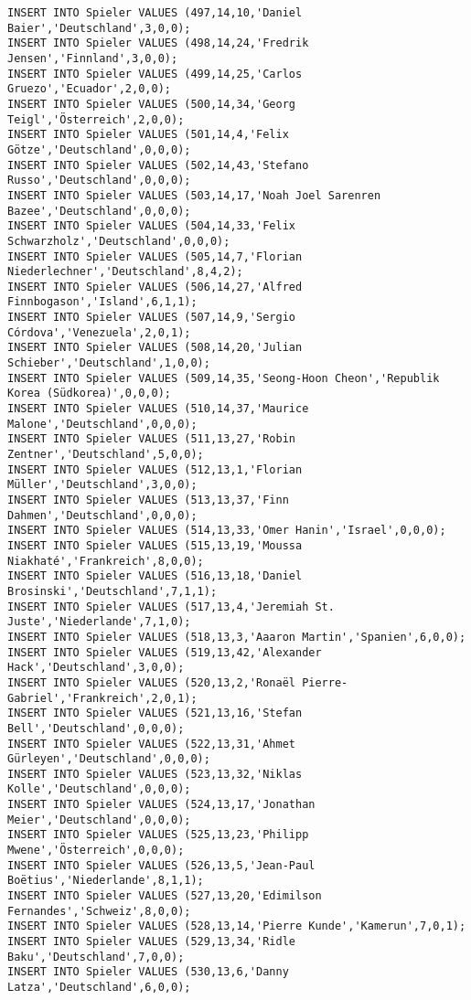 \documentclass{bschlangaul-aufgabe}
\begin{document}
\begin{verbatim}
INSERT INTO Spieler VALUES (497,14,10,'Daniel Baier','Deutschland',3,0,0);
INSERT INTO Spieler VALUES (498,14,24,'Fredrik Jensen','Finnland',3,0,0);
INSERT INTO Spieler VALUES (499,14,25,'Carlos Gruezo','Ecuador',2,0,0);
INSERT INTO Spieler VALUES (500,14,34,'Georg Teigl','Österreich',2,0,0);
INSERT INTO Spieler VALUES (501,14,4,'Felix Götze','Deutschland',0,0,0);
INSERT INTO Spieler VALUES (502,14,43,'Stefano Russo','Deutschland',0,0,0);
INSERT INTO Spieler VALUES (503,14,17,'Noah Joel Sarenren Bazee','Deutschland',0,0,0);
INSERT INTO Spieler VALUES (504,14,33,'Felix Schwarzholz','Deutschland',0,0,0);
INSERT INTO Spieler VALUES (505,14,7,'Florian Niederlechner','Deutschland',8,4,2);
INSERT INTO Spieler VALUES (506,14,27,'Alfred Finnbogason','Island',6,1,1);
INSERT INTO Spieler VALUES (507,14,9,'Sergio Córdova','Venezuela',2,0,1);
INSERT INTO Spieler VALUES (508,14,20,'Julian Schieber','Deutschland',1,0,0);
INSERT INTO Spieler VALUES (509,14,35,'Seong-Hoon Cheon','Republik Korea (Südkorea)',0,0,0);
INSERT INTO Spieler VALUES (510,14,37,'Maurice Malone','Deutschland',0,0,0);
INSERT INTO Spieler VALUES (511,13,27,'Robin Zentner','Deutschland',5,0,0);
INSERT INTO Spieler VALUES (512,13,1,'Florian Müller','Deutschland',3,0,0);
INSERT INTO Spieler VALUES (513,13,37,'Finn Dahmen','Deutschland',0,0,0);
INSERT INTO Spieler VALUES (514,13,33,'Omer Hanin','Israel',0,0,0);
INSERT INTO Spieler VALUES (515,13,19,'Moussa Niakhaté','Frankreich',8,0,0);
INSERT INTO Spieler VALUES (516,13,18,'Daniel Brosinski','Deutschland',7,1,1);
INSERT INTO Spieler VALUES (517,13,4,'Jeremiah St. Juste','Niederlande',7,1,0);
INSERT INTO Spieler VALUES (518,13,3,'Aaaron Martin','Spanien',6,0,0);
INSERT INTO Spieler VALUES (519,13,42,'Alexander Hack','Deutschland',3,0,0);
INSERT INTO Spieler VALUES (520,13,2,'Ronaël Pierre-Gabriel','Frankreich',2,0,1);
INSERT INTO Spieler VALUES (521,13,16,'Stefan Bell','Deutschland',0,0,0);
INSERT INTO Spieler VALUES (522,13,31,'Ahmet Gürleyen','Deutschland',0,0,0);
INSERT INTO Spieler VALUES (523,13,32,'Niklas Kolle','Deutschland',0,0,0);
INSERT INTO Spieler VALUES (524,13,17,'Jonathan Meier','Deutschland',0,0,0);
INSERT INTO Spieler VALUES (525,13,23,'Philipp Mwene','Österreich',0,0,0);
INSERT INTO Spieler VALUES (526,13,5,'Jean-Paul Boëtius','Niederlande',8,1,1);
INSERT INTO Spieler VALUES (527,13,20,'Edimilson Fernandes','Schweiz',8,0,0);
INSERT INTO Spieler VALUES (528,13,14,'Pierre Kunde','Kamerun',7,0,1);
INSERT INTO Spieler VALUES (529,13,34,'Ridle Baku','Deutschland',7,0,0);
INSERT INTO Spieler VALUES (530,13,6,'Danny Latza','Deutschland',6,0,0);

\end{verbatim}
\end{document}
